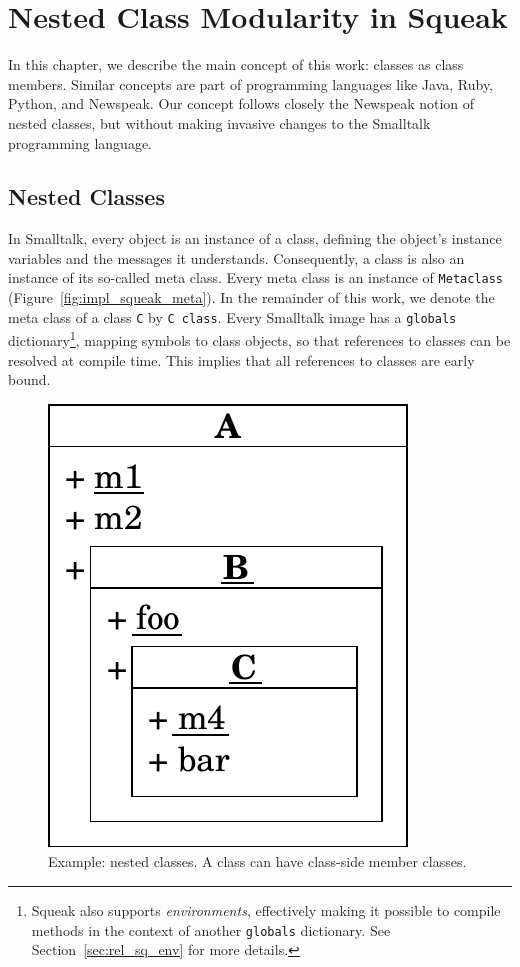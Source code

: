 \chapter{Nested Class Modularity in Squeak}
\label{sec:concept}
In this chapter, we describe the main concept of this work: classes as class members. Similar concepts are part of programming languages like Java, Ruby, Python, and Newspeak. Our concept follows closely the Newspeak notion of nested classes, but without making invasive changes to the Smalltalk programming language.

\section{Nested Classes}
In Smalltalk, every object is an instance of a class, defining the object's instance variables and the messages it understands. Consequently, a class is also an instance of its so-called meta class. Every meta class is an instance of \texttt{Metaclass} (Figure~\ref{fig:impl_squeak_meta}). In the remainder of this work, we denote the meta class of a class \texttt{C} by \texttt{C class}. Every Smalltalk image has a \texttt{globals} dictionary\footnote{Squeak also supports \emph{environments}, effectively making it possible to compile methods in the context of another \texttt{globals} dictionary. See Section~\ref{sec:rel_sq_env} for more details.}, mapping symbols to class objects, so that references to classes can be resolved at compile time. This implies that all references to classes are early bound.

\begin{figure}
	\includegraphics[scale=0.75]{nested_notation.pdf}
	\centering
	\caption[Example: Nested classes]{Example: nested classes. A class can have class-side member classes.}
	\label{fig:concept_nested_notation}
\end{figure}

